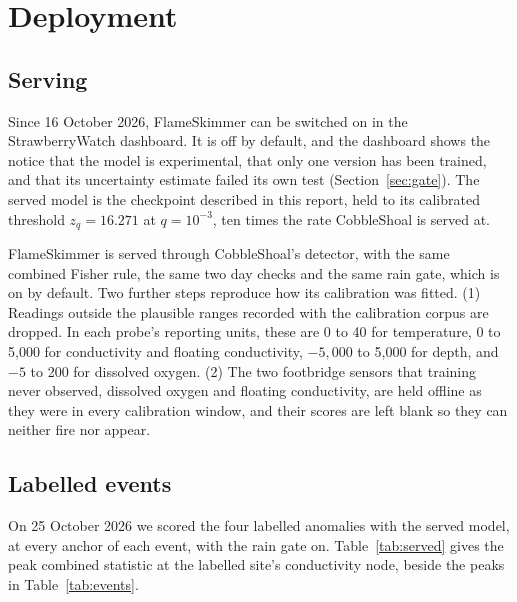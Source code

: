 \documentclass{article}
\begin{document}
\section{Deployment}
\label{sec:deployment}

\subsection{Serving}
\label{sec:serving}

Since 16 October 2026, FlameSkimmer can be switched on in the StrawberryWatch
dashboard. It is off by default, and the dashboard shows the notice that the
model is experimental, that only one version has been trained, and that its
uncertainty estimate failed its own test (Section~\ref{sec:gate}). The served
model is the checkpoint described in this report, held to its calibrated
threshold $z_q = 16.271$ at $q = 10^{-3}$, ten times the rate CobbleShoal is
served at.

FlameSkimmer is served through CobbleShoal's detector, with the same combined
Fisher rule, the same two day checks and the same rain gate, which is on by
default. Two further steps reproduce how its calibration was fitted. (1)
Readings outside the plausible ranges recorded with the calibration corpus are
dropped. In each probe's reporting units, these are 0 to 40 for temperature, 0 to 5{,}000 for conductivity and floating
conductivity, $-5{,}000$ to 5{,}000 for depth, and $-5$ to 200 for dissolved
oxygen. (2) The two footbridge sensors that training never observed,
dissolved oxygen and floating conductivity, are held offline as they were in
every calibration window, and their scores are left blank so they can neither
fire nor appear.

\subsection{Labelled events}
\label{sec:servedevents}

On 25 October 2026 we scored the four labelled anomalies with the served model,
at every anchor of each event, with the rain gate on. Table~\ref{tab:served}
gives the peak combined statistic at the labelled site's conductivity node,
beside the peaks in Table~\ref{tab:events}.
\end{document}
